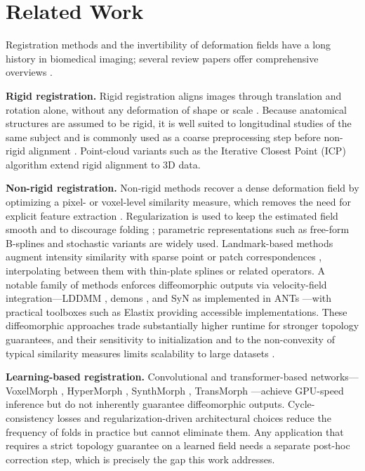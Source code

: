 \documentclass[lettersize,journal]{IEEEtran}
\begin{document}
\section{Related Work}
\label{sec:related_work}

Registration methods and the invertibility of deformation fields \cite{Dupuis1998} have a long history in biomedical imaging; several review papers offer comprehensive overviews \cite{KLEIN2009786}.

\textbf{Rigid registration.} Rigid registration aligns images through translation and rotation alone, without any deformation of shape or scale \cite{Zhang1994IterativePM}. Because anatomical structures are assumed to be rigid, it is well suited to longitudinal studies of the same subject \cite{REUTER20101181} and is commonly used as a coarse preprocessing step before non-rigid alignment \cite{Frackowiak2004-yy}. Point-cloud variants such as the Iterative Closest Point (ICP) algorithm \cite{Zhang1994IterativePM} extend rigid alignment to 3D data.

\textbf{Non-rigid registration.} Non-rigid methods recover a dense deformation field by optimizing a pixel- or voxel-level similarity measure, which removes the need for explicit feature extraction \cite{regreviewsong}. Regularization is used to keep the estimated field smooth and to discourage folding \cite{Reithmeir2024}; parametric representations such as free-form B-splines \cite{Rueckert1999} and stochastic variants \cite{Tustison2009} are widely used. Landmark-based methods \cite{MAINTZ19981, ZITOVA2003977} augment intensity similarity with sparse point or patch correspondences \cite{Ourselin2000BlockMA, PatchBasedRegistration}, interpolating between them with thin-plate splines \cite{Sun2011} or related operators. A notable family of methods enforces diffeomorphic outputs via velocity-field integration---LDDMM \cite{Beg2005}, demons \cite{THIRION1998243, VERCAUTEREN2009S61}, and SyN as implemented in ANTs \cite{AVANTS200826}---with practical toolboxes such as Elastix \cite{Klein2010elastixAT} providing accessible implementations. These diffeomorphic approaches trade substantially higher runtime for stronger topology guarantees, and their sensitivity to initialization and to the non-convexity of typical similarity measures limits scalability to large datasets \cite{VARNAVAS2015108}.

\textbf{Learning-based registration.} Convolutional and transformer-based networks---VoxelMorph \cite{VoxelMorph2019}, HyperMorph \cite{Hoopes2021HyperMorph}, SynthMorph \cite{hoffmann2022synthmorph}, TransMorph \cite{CHEN2022102615}---achieve GPU-speed inference but do not inherently guarantee diffeomorphic outputs. Cycle-consistency losses \cite{KIM2021CycleMorph} and regularization-driven architectural choices \cite{Dalca2018, Huang2023} reduce the frequency of folds in practice but cannot eliminate them. Any application that requires a strict topology guarantee on a learned field needs a separate post-hoc correction step, which is precisely the gap this work addresses.
\end{document}
